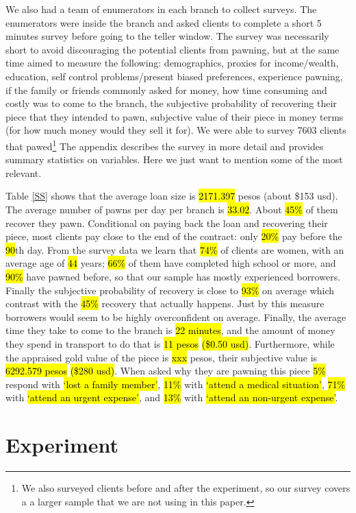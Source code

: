 \documentclass[11pt]{article}
\begin{document}
    We also had a team of enumerators in each branch to collect surveys. The enumerators were inside the branch and asked clients to complete a short 5 minutes survey before going to the teller window. The survey was necessarily short to avoid discouraging the potential clients from pawning, but at the same time aimed to measure the following: demographics, proxies for income/wealth, education, self control problems/present biased preferences, experience pawning, if the family or friends commonly asked for money, how time consuming and costly was to come to the branch, the subjective probability of recovering their piece that they intended to pawn, subjective value of their piece in money terms (for how much money would they sell it for). We were able to survey 7603 clients that pawed\footnote{We also surveyed clients before and after the experiment, so our survey covers a a larger sample that we are not using in this paper.} The appendix describes the survey in more detail and provides summary statistics on variables. Here we just want to mention some of the most relevant. 
    
    Table \ref{SS} shows that the average loan size is \hl{ 2171.397} pesos (about \$153 usd). The average number of pawns per day per branch is \hl{33.02}. About \hl{45\%} of them recover they pawn. Conditional on paying back the loan and recovering their piece, most clients pay close to the end of the contract: only \hl{20\%} pay before the \hl{90}th day. From the survey data we learn that \hl{74\%} of clients are women, with an average age of \hl{44} years; \hl{66\%} of them have completed high school or more, and \hl{90\%} have pawned before, so that our sample has mostly experienced borrowers. Finally the subjective probability of recovery is close to \hl{93\%} on average which contrast with the \hl{45\%} recovery that actually happens. Just by this measure borrowers would seem to be highly overconfident on average. Finally, the average time they take to come to the branch is \hl{22 minutes}, and the amount of money they spend in transport to do that is \hl{11 pesos} \hl{(\$0.50 usd)}. Furthermore, while the appraised gold value of the piece is \hl{xxx} pesos, their subjective value is \hl{6292.579 pesos}  \hl{(\$280 usd)}. When asked why they are pawning this piece \hl{5\%} respond with \hl{`lost a family member'}, \hl{11\%} with \hl{`attend a medical situation'}, \hl{71\%} with \hl{`attend an urgent expense'}, and  \hl{13\%} with \hl{`attend an non-urgent expense'}.


\section{Experiment}
\end{document}
